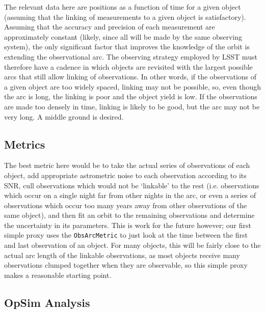 The relevant data here are positions as a function of time for a given
object (assuming that the linking of measurements to a given object is
satisfactory). Assuming that the accuracy and precision of each
measurement are approximately constant (likely, since all will be made
by the same observing system), the only significant factor that improves
the knowledge of the orbit is extending the observational arc. The
observing strategy employed by LSST must therefore have a cadence in
which objects are revisited with the largest possible arcs that still
allow linking of observations. In other words, if the observations of a
given object are too widely spaced, linking may not be possible, so,
even though the arc is long, the linking is poor and the object yield is
low. If the observations are made too densely in time, linking is likely
to be good, but the arc may not be very long. A middle ground is
desired.


\subsection{Metrics}
\label{sec:\secname:metrics}

The best metric here would be to take the actual series of observations
of each object, add appropriate astrometric noise to each observation
according to its SNR, cull observations which would not be `linkable' to
the rest (i.e. observations which occur on a single night far from other
nights in the arc, or even a series of observations which occur too many
years away from other observations of the same object), and then fit an
orbit to the remaining observations and determine the uncertainty in its
parameters. This is work for the future however; our first simple proxy
uses the {\tt ObsArcMetric} to just look at the time between the first
and last observation of an object. For many objects, this will be fairly
close to the actual arc length of the linkable observations, as most
objects receive many observations clumped together when they are
observable, so this simple proxy makes a reasonable starting point.



\subsection{OpSim Analysis}
\label{sec:\secname:analysis}

